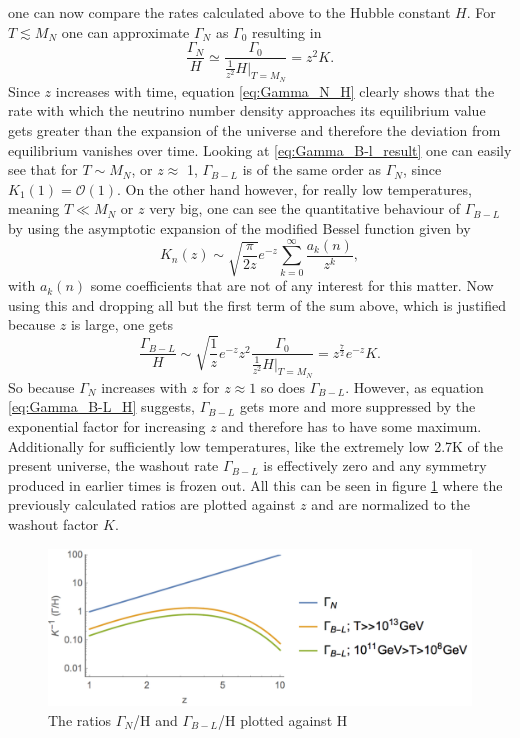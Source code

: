 one can now compare the rates calculated above to the Hubble constant $H$.\newline\indent
For $T\lesssim M_N$ one can approximate $\Gamma_N$ as $\Gamma_0$ resulting in 
\begin{equation}
	\frac{\Gamma_N}{H}\simeq\frac{\Gamma_0}{\frac{1}{z^2}\left.H\right|_{T=M_N}}=z^2K.
	\label{eq:Gamma_N_H}
\end{equation}
Since $z$ increases with time, equation \eqref{eq:Gamma_N_H} clearly shows that the rate with which the neutrino number density approaches its equilibrium value gets greater than the expansion of the universe and therefore the deviation from equilibrium vanishes over time. \newline\indent
Looking at \eqref{eq:Gamma_B-l_result} one can easily see that for $T \sim M_N$, or $z\approx$ 1, $\Gamma_{B-L}$ is of the same order as $\Gamma_N$, since $K_1(1)=\mathcal{O}(1)$. On the other hand however, for really low temperatures, meaning $T\ll M_N$ or $z$ very big, one can see the quantitative behaviour of $\Gamma_{B-L}$ by using the asymptotic expansion of the modified Bessel function given by
\begin{equation*}
	K_{n}(z)\sim\sqrt{\frac{\pi}{2z}}e^{-z}\sum_{k=0}^{\infty}\frac{a_{k}(n)}{z^k},
\end{equation*}
with $a_{k}(n)$ some coefficients that are not of any interest for this matter. Now using this and dropping all but the first term of the sum above, which is justified because $z$ is large, one gets
\begin{equation}
	\frac{\Gamma_{B-L}}{H}\sim\sqrt{\frac{1}{z}}e^{-z}z^2\frac{\Gamma_0}{\frac{1}{z^2}\left.H\right|_{T=M_{N}}}=z^\frac{7}{2}e^{-z}K.
	\label{eq:Gamma_B-L_H}
\end{equation}
So because $\Gamma_N$ increases with $z$ for $z\approx1$ so does $\Gamma_{B-L}$. However, as equation \eqref{eq:Gamma_B-L_H} suggests, $\Gamma_{B-L}$ gets more and more suppressed by the exponential factor for increasing $z$ and therefore has to have some maximum. Additionally for sufficiently low temperatures, like the extremely low 2.7K of the present universe, the washout rate $\Gamma_{B-L}$ is effectively zero and any symmetry produced in earlier times is frozen out. 
All this can be seen in figure \ref{fig:rates} where the previously calculated ratios are plotted against $z$ and are normalized to the washout factor $K$.
\begin{figure}[H]
	\centering
	\includegraphics[width=0.8\linewidth]{Images/rates}
	\caption{The ratios $\Gamma_{N}$/H and $\Gamma_{B-L}$/H plotted against H}
	\label{fig:rates}
\end{figure}
